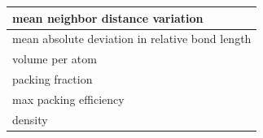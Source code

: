 \documentclass{article}
\begin{document}
\begin{table}[H]
\begin{tabular}{|l|}
mean neighbor distance variation                \\ \hline
mean absolute deviation in relative bond length \\ \hline
volume per atom                                 \\ \hline                   
packing fraction                                \\ \hline
max packing efficiency                          \\ \hline
density                                         \\ \hline
\end{tabular}
\label{Tab:PF_Heusler}
\end{table}
\end{document}
